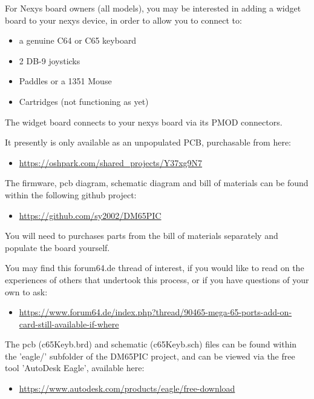 For Nexys board owners (all models), you may be interested in adding a widget board to your nexys device, in order to allow you to connect to:

\begin{itemize}
  \item{a genuine C64 or C65 keyboard}
  \item{2 DB-9 joysticks}
  \item{Paddles or a 1351 Mouse}
  \item{Cartridges (not functioning as yet)}
\end{itemize}

The widget board connects to your nexys board via its PMOD connectors.

It presently is only available as an unpopulated PCB, purchasable from here:

\begin{itemize}
  \item \url{https://oshpark.com/shared\_projects/Y37xg9N7}
\end{itemize}

The firmware, pcb diagram, schematic diagram and bill of materials can be found within the following github project:

\begin{itemize}
  \item \url{https://github.com/sy2002/DM65PIC}
\end{itemize}

You will need to purchases parts from the bill of materials separately and populate the board yourself.

You may find this forum64.de thread of interest, if you would like to read on the experiences of others that undertook this process, or if you have questions of your own to ask:

\begin{itemize}
  \item \url{https://www.forum64.de/index.php?thread/90465-mega-65-ports-add-on-card-still-available-if-where}
\end{itemize}

The pcb (c65Keyb.brd) and schematic (c65Keyb.sch) files can be found within the 'eagle/' subfolder of the DM65PIC project, and can be viewed via the free tool 'AutoDesk Eagle', available here:

\begin{itemize}
  \item \url{https://www.autodesk.com/products/eagle/free-download}
\end{itemize}

